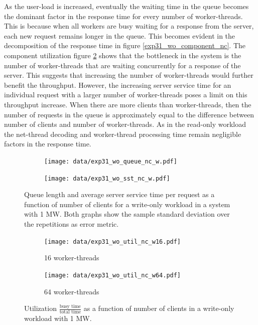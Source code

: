 \documentclass[report.tex]{subfiles}
\begin{document}
As the user-load is increased, eventually the waiting time in the queue becomes the dominant factor in the response time for every number of worker-threads. This is because when all workers are busy waiting for a response from the server,  each new request remains longer in the queue.
This becomes evident in the decomposition of the response time in figure \ref{exp31_wo_component_nc}.
The component utilization figure \ref{exp31_wo_util} shows that the bottleneck in the system is the number of worker-threads that are waiting concurrently for a response of the server. This suggests that increasing the number of worker-threads would further benefit the throughput. However, the increasing server service time for an individual request with a larger number of worker-threads poses a limit on this throughput increase.
When there are more clients than worker-threads, then the number of requests in the queue is approximately equal to the difference between number of clients and number of worker-threads.
As in the read-only workload the net-thread decoding and worker-thread processing time remain negligible factors in the response time.


\begin{figure}[H]
	\begin{subfigure}[b]{.499\linewidth}
		\centering
		\texttt{[image: data/exp31\_wo\_queue\_nc\_w.pdf]}
	\end{subfigure}\hfill
	\begin{subfigure}[b]{.499\linewidth}
		\centering
		\texttt{[image: data/exp31\_wo\_sst\_nc\_w.pdf]}
	\end{subfigure}\hfill
	\caption{Queue length and average server service time per request as a function of number of clients for a write-only workload in a system with 1 MW. Both graphs show the sample standard deviation over the repetitions as error metric.}\label{exp31_wo_queue_sst_nc}
\end{figure}

\begin{figure}[H]
	\begin{subfigure}[b]{.499\linewidth}
		\centering
		\texttt{[image: data/exp31\_wo\_util\_nc\_w16.pdf]}
		\caption{16 worker-threads}
	\end{subfigure}\hfill
	\begin{subfigure}[b]{.499\linewidth}
		\centering
		\texttt{[image: data/exp31\_wo\_util\_nc\_w64.pdf]}
		\caption{64 worker-threads}
	\end{subfigure}\hfill
	\caption{Utilization $\frac{\text{busy time}}{\text{total time}}$ as a function of number of clients in a write-only workload with 1 MW.}\label{exp31_wo_util}
\end{figure}
\end{document}
